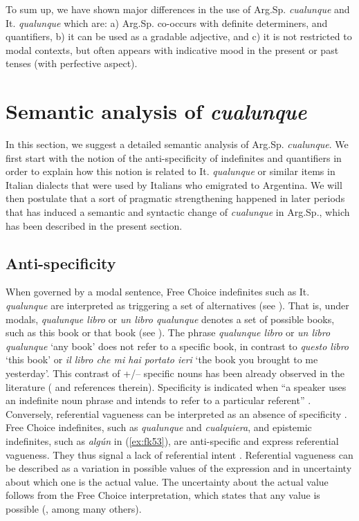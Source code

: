 \documentclass[output=paper,colorlinks,citecolor=brown]{langscibook}
\begin{document}
To sum up, we have shown major differences in the use of Arg.Sp. \textit{cualunque} and It. \textit{qualunque} which are: a) Arg.Sp. co-occurs with definite determiners, and quantifiers, b) it can be used as a gradable adjective, and c) it is not restricted to modal contexts, but often appears with indicative mood in the present or past tenses (with perfective aspect).\largerpage[2]

\section{Semantic analysis of \textit{cualunque}}\label{sec:fk5}
In this section, we suggest a detailed semantic analysis of Arg.Sp. \textit{cualunque}. We first start with the notion of the anti-specificity of indefinites and quantifiers in order to explain how this notion is related to It. \textit{qualunque} or similar items in Italian dialects that were used by Italians who emigrated to Argentina. We will then postulate that a sort of pragmatic strengthening happened in later periods that has induced a semantic and syntactic change of \textit{cualunque} in Arg.Sp., which has been described in the present section.

\subsection{Anti-specificity}\label{sec:fk5.1}
When governed by a modal sentence, Free Choice indefinites such as It. \textit{qualunque} are interpreted as triggering a set of alternatives (see  ). That is, under modals, \textit{qualunque libro} or \textit{un libro qualunque} denotes a set of possible books, such as this book or that book (see  ). The phrase \textit{qualunque libro} or  \textit{un libro qualunque} ‘any book’ does not refer to a specific book, in contrast to \textit{questo libro} ‘this book’ or \textit{il libro che mi hai portato ieri} ‘the book you brought to me yesterday’. This contrast of +/$–$ specific nouns has been already observed in the literature (\cite[see][]{Heusinger2011, EtxeberriaGiannakidou2014, GiannakidouQuer2013} and references therein). Specificity is indicated when “a speaker uses an indefinite noun phrase and intends to refer to a particular referent” \citep[][10]{Heusinger2011}. Conversely, referential vagueness can be interpreted as an absence of specificity \citep{Heusinger2011, GiannakidouQuer2013}. Free Choice indefinites, such as \textit{qualunque} and \textit{cualquiera}, and epistemic indefinites, such as \textit{algún} in (\ref{ex:fk53}), are anti-specific and express referential vagueness. They thus signal a lack of referential intent \citep{Heusinger2011}. Referential vagueness can be described as a variation in possible values of the expression and in uncertainty about which one is the actual value. The uncertainty about the actual value follows from the Free Choice interpretation, which states that any value is possible (\cite[see][]{AloniPort2013}, among many others).
\end{document}
